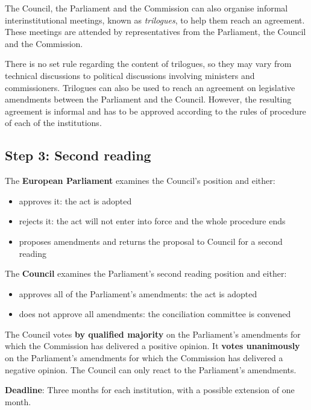 The Council, the Parliament and the Commission can also organise informal interinstitutional meetings, known as \textit{trilogues}, to help them reach an agreement. These meetings are attended by representatives from the Parliament, the Council and the Commission. 

There is no set rule regarding the content of trilogues, so they may vary from technical discussions to political discussions involving ministers and commissioners. Trilogues can also be used to reach an agreement on legislative amendments between the Parliament and the Council. However, the resulting agreement is informal and has to be approved according to the rules of procedure of each of the institutions.
\clearpage

\subsection{Step 3: Second reading}
The \textbf{European Parliament} examines the Council's position and either:
\begin{itemize}
	\item approves it: the act is adopted
	\item rejects it: the act will not enter into force and the whole procedure ends
	\item proposes amendments and returns the proposal to Council for a second reading
\end{itemize}

The \textbf{Council} examines the Parliament's second reading position and either:
\begin{itemize}
	\item approves all of the Parliament's amendments: the act is adopted
	\item does not approve all amendments: the conciliation committee is convened
\end{itemize}

The Council votes \textbf{by qualified majority} on the Parliament's amendments for which the Commission has delivered a positive opinion. It \textbf{votes unanimously} on the Parliament's amendments for which the Commission has delivered a negative opinion. The Council can only react to the Parliament's amendments.

\textbf{Deadline}: Three months for each institution, with a possible extension of one month.

